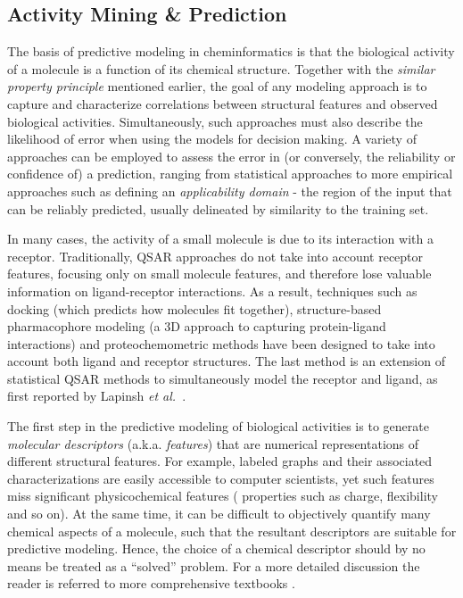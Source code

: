 \documentclass{sig-alternate}
\begin{document}
\subsection{Activity Mining \& Prediction}
\label{sec:activity-mining}


The basis of predictive modeling in cheminformatics is that the
biological activity of a molecule is a function of its chemical
structure. Together with the \emph{similar property principle}
\cite{Johnson:1990qf} mentioned earlier,
the goal of any modeling approach is to capture
and characterize correlations between structural features and
observed biological activities. Simultaneously, such approaches must
also describe the likelihood of error when using the
models for decision making.  A variety of approaches can be employed
to assess the error in (or conversely, the reliability or confidence of) a
prediction, ranging from statistical approaches to more
empirical approaches such as defining an \emph{applicability domain} -
the region of the input that can be
reliably predicted, usually delineated by similarity
to the training set.

In many cases, the activity of a small molecule is due to its
interaction with a receptor. Traditionally, QSAR \cite{Hansch:1962vn,
 Free:1964ys} approaches do not take into account receptor features,
focusing only on small molecule features, and therefore lose valuable
information on ligand-receptor interactions. As a result, techniques
such as docking (which predicts how molecules fit together),
structure-based pharmacophore modeling (a 3D approach to capturing protein-ligand
interactions) and proteochemometric methods have been designed to take
into account both ligand and receptor structures. The last method is
an extension of statistical QSAR methods to simultaneously
model the receptor and ligand, as first reported by Lapinsh \textit{et
 al.}~\cite{lapinsh2001}.

The first step in the predictive modeling of biological activities is
to generate \emph{molecular descriptors} (a.k.a. \emph{features}) that
are numerical representations of different structural features. For
example, labeled graphs and their associated
characterizations are easily accessible to computer scientists, yet
such features miss significant physicochemical features (
properties such as charge, flexibility and so on). At the same time,
it can be difficult to objectively quantify many chemical aspects of a
molecule, such that the resultant descriptors are suitable for
predictive modeling.  Hence, the choice of a chemical descriptor
should by no means be treated as a ``solved'' problem. For a more
detailed discussion the reader is referred to more comprehensive
textbooks \cite{todeschini2000,faulon2010}.
\end{document}
